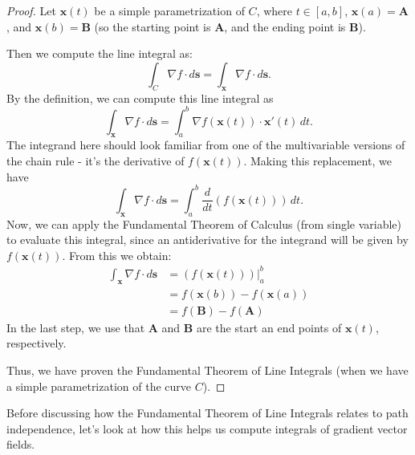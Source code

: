 \documentclass{ximera}
\begin{document}
\begin{proof}
Let $\textbf{x}(t)$ be a simple parametrization of $C$, where $t\in[a,b]$, $\textbf{x}(a)=\textbf{A}$, and $\textbf{x}(b)=\textbf{B}$ (so the starting point is $\textbf{A}$, and the ending point is $\textbf{B}$).

Then we compute the line integral as:
\[
\int_C\nabla f\cdot d\textbf{s} = \int_\textbf{x}\nabla f\cdot d\textbf{s}.
\]
By the definition, we can compute this line integral as
\[
\int_\textbf{x}\nabla f\cdot d\textbf{s} = \int_a^b \nabla f(\textbf{x}(t))\cdot\textbf{x}'(t)\,dt.
\]
The integrand here should look familiar from one of the multivariable versions of the chain rule - it's the derivative of $f(\textbf{x}(t))$. Making this replacement, we have
\[
\int_\textbf{x}\nabla f\cdot d\textbf{s} = \int_a^b \frac{d}{dt}(f(\textbf{x}(t)))\,dt.
\]
Now, we can apply the Fundamental Theorem of Calculus (from single variable) to evaluate this integral, since an antiderivative for the integrand will be given by $f(\textbf{x}(t))$. From this we obtain:
\begin{align*}
\int_\textbf{x}\nabla f\cdot d\textbf{s} &= (f(\textbf{x}(t)))\vert_a^b\\
&= f(\textbf{x}(b))-f(\textbf{x}(a))\\
&= f(\textbf{B})-f(\textbf{A})
\end{align*}
In the last step, we use that $\textbf{A}$ and $\textbf{B}$ are the start an end points of $\textbf{x}(t)$, respectively.

Thus, we have proven the Fundamental Theorem of Line Integrals (when we have a simple parametrization of the curve $C$).
\end{proof}

Before discussing how the Fundamental Theorem of Line Integrals relates to path independence, let's look at how this helps us compute integrals of gradient vector fields.
\end{document}
